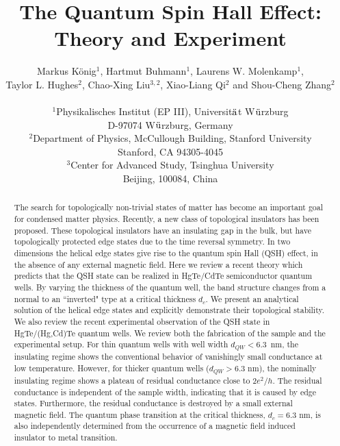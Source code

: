 \documentclass{article}
\begin{document}
\title{The Quantum Spin Hall Effect: \\ Theory and Experiment}
\author
{Markus K\"{o}nig$^{1}$, Hartmut Buhmann$^{1}$, Laurens W.
Molenkamp$^{1}$,
\\Taylor L. Hughes$^{2}$, Chao-Xing Liu$^{3,2}$, Xiao-Liang Qi$^{2}$ and Shou-Cheng Zhang$^{2}$\\
\\
\normalsize{$^{1}$Physikalisches Institut (EP III),
Universit$\ddot{\rm a}$t W$\ddot{\rm u}$rzburg}\\
\normalsize{D-97074 W$\ddot{\rm u}$rzburg, Germany}
\\
\normalsize{$^{2}$Department of Physics, McCullough Building,
Stanford
University}\\
\normalsize{Stanford, CA 94305-4045}\\
\normalsize{$^{3}$Center for Advanced Study, Tsinghua University}\\
\normalsize{Beijing, 100084, China}\\
}

\maketitle
\begin{abstract}
The search for topologically non-trivial states of matter has become
an important goal for condensed matter physics. Recently, a new
class of topological insulators has been proposed. These topological
insulators have an insulating gap in the bulk, but have
topologically protected edge states due to the time reversal
symmetry. In two dimensions the helical edge states give rise to the
quantum spin Hall (QSH) effect, in the absence of any external
magnetic field. Here we review a recent theory which predicts that
the QSH state can be realized in HgTe/CdTe semiconductor quantum
wells. By varying the thickness of the quantum well, the band
structure changes from a normal to an ``inverted" type at a critical
thickness $d_c$. We present an analytical solution of the helical
edge states and explicitly demonstrate their topological stability.
We also review the recent experimental observation of the QSH state
in HgTe/(Hg,Cd)Te quantum wells. We review both the fabrication of
the sample and the experimental setup. For thin quantum wells with
well width $d_{QW}< 6.3$~nm, the insulating regime shows the
conventional behavior of vanishingly small conductance at low
temperature. However, for thicker quantum wells ($d_{QW}> 6.3$ nm),
the nominally insulating regime shows a plateau of residual
conductance close to $2e^2/h$. The residual conductance is
independent of the sample width, indicating that it is caused by
edge states. Furthermore, the residual conductance is destroyed by a
small external magnetic field. The quantum phase transition at the
critical thickness, $d_c= 6.3$ nm, is also independently determined
from the occurrence of a magnetic field induced insulator to metal
transition.
\end{abstract}
\end{document}
